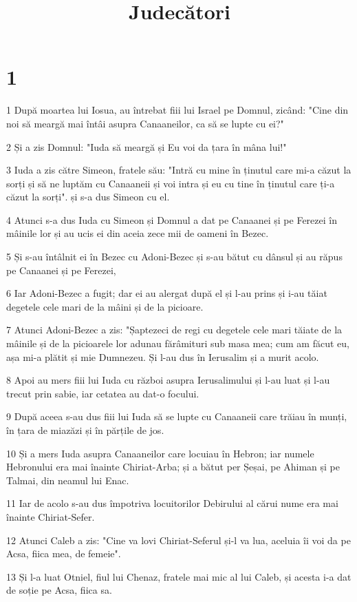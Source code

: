 

\title{Judecători}


\chapter{1}

\par 1 După moartea lui Iosua, au întrebat fiii lui Israel pe Domnul, zicând: "Cine din noi să meargă mai întâi asupra Canaaneilor, ca să se lupte cu ei?"
\par 2 Și a zis Domnul: "Iuda să meargă și Eu voi da țara în mâna lui!"
\par 3 Iuda a zis către Simeon, fratele său: "Intră cu mine în ținutul care mi-a căzut la sorți și să ne luptăm cu Canaaneii și voi intra și eu cu tine în ținutul care ți-a căzut la sorți". și s-a dus Simeon cu el.
\par 4 Atunci s-a dus Iuda cu Simeon și Domnul a dat pe Canaanei și pe Ferezei în mâinile lor și au ucis ei din aceia zece mii de oameni în Bezec.
\par 5 Și s-au întâlnit ei în Bezec cu Adoni-Bezec și s-au bătut cu dânsul și au răpus pe Canaanei și pe Ferezei,
\par 6 Iar Adoni-Bezec a fugit; dar ei au alergat după el și l-au prins și i-au tăiat degetele cele mari de la mâini și de la picioare.
\par 7 Atunci Adoni-Bezec a zis: "Șaptezeci de regi cu degetele cele mari tăiate de la mâinile și de la picioarele lor adunau fărâmituri sub masa mea; cum am făcut eu, așa mi-a plătit și mie Dumnezeu. Și l-au dus în Ierusalim și a murit acolo.
\par 8 Apoi au mers fiii lui Iuda cu război asupra Ierusalimului și l-au luat și l-au trecut prin sabie, iar cetatea au dat-o focului.
\par 9 După aceea s-au dus fiii lui Iuda să se lupte cu Canaaneii care trăiau în munți, în țara de miazăzi și în părțile de jos.
\par 10 Și a mers Iuda asupra Canaaneilor care locuiau în Hebron; iar numele Hebronului era mai înainte Chiriat-Arba; și a bătut per Șeșai, pe Ahiman și pe Talmai, din neamul lui Enac.
\par 11 Iar de acolo s-au dus împotriva locuitorilor Debirului al cărui nume era mai înainte Chiriat-Sefer.
\par 12 Atunci Caleb a zis: "Cine va lovi Chiriat-Seferul și-l va lua, aceluia îi voi da pe Acsa, fiica mea, de femeie".
\par 13 Și l-a luat Otniel, fiul lui Chenaz, fratele mai mic al lui Caleb, și acesta i-a dat de soție pe Acsa, fiica sa.
